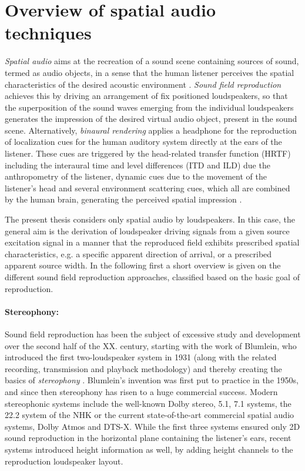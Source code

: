 \section{Overview of spatial audio techniques}
\emph{Spatial audio} aims at the recreation of a sound scene containing sources of sound, termed as audio objects, in a sense that the human listener perceives the spatial characteristics of the desired acoustic environment \cite{Zhang2017}.
\emph{Sound field reproduction} achieves this by driving an arrangement of fix positioned loudspeakers, so that the superposition of the sound waves emerging from the individual loudspeakers generates the impression of the desired virtual audio object, present in the sound scene.
Alternatively, \emph{binaural rendering} applies a headphone for the reproduction of localization cues for the human auditory system directly at the ears of the listener.
These cues are triggered by the head-related transfer function (HRTF) including the interaural time and level differences (ITD and ILD) due the anthropometry of the listener, dynamic cues due to the movement of the listener's head and several environment scattering cues, which all are combined by the human brain, generating the perceived spatial impression \cite{Blauert1983}.

The present thesis considers only spatial audio by loudspeakers.
In this case, the general aim is the derivation of loudspeaker driving signals from a given source excitation signal in a manner that the reproduced field exhibits prescribed spatial characteristics, e.g. a specific apparent direction of arrival, or a prescribed apparent source width.
In the following first a short overview is given on the different sound field reproduction approaches, classified based on the basic goal of reproduction.

\paragraph{Stereophony:}
Sound field reproduction has been the subject of excessive study and development over the second half of the XX. century, starting with the work of Blumlein, who introduced the first two-loudspeaker system in 1931 (along with the related recording, transmission and playback methodology) and thereby creating the basics of \emph{stereophony} \cite{Blumlein1932, Alexander2000}.
Blumlein's invention was first put to practice in the 1950s, and since then stereophony has risen to a huge commercial success.
Modern stereophonic systems include the well-known Dolby stereo, 5.1, 7.1 systems, the 22.2 system of the NHK \cite{hamasaki2005the, hamasaki2011the} or the current state-of-the-art commercial spatial audio systems, Dolby Atmos \cite{Atmos} and DTS-X.
While the first three systems ensured only 2D sound reproduction in the horizontal plane containing the listener's ears, recent systems introduced height information as well, by adding height channels to the reproduction loudspeaker layout.

